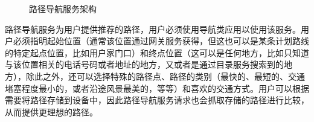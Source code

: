 \documentclass{article}
\begin{document}
\begin{CJK}{UTF8}{gbsn}
	\begin{figure}[htbp]
		\centering
		\hspace{10pt}
		\caption{路径导航服务架构}
	\end{figure}

	路径导航服务为用户提供推荐的路径，用户必须使用导航类应用以使用该服务。用户必须指明起始位置（通常该位置通过网关服务获得，但这也可以是某条计划路线的特定起点位置，比如用户家门口）和终点位置（这可以是任何地方，比如只知道与该位置相关的电话号码或者地址的地方，又或者是通过目录服务搜索到的地方），除此之外，还可以选择特殊的路径点、路径的类别（最快的、最短的、交通堵塞程度最小的，或者沿途风景最美的，等等）和喜欢的交通方式。用户可以根据需要将路径存储到设备中，因此路径导航服务请求也会抓取存储的路径进行比较，从而提供更理想的路径。


\end{CJK}
\end{document}

